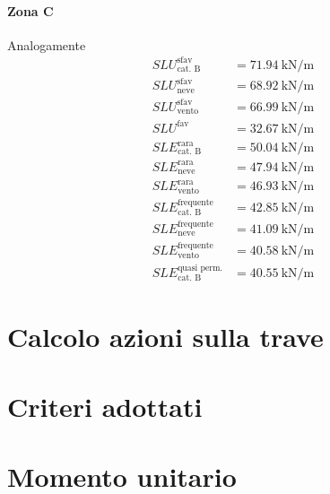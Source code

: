 \paragraph*{Zona C} Analogamente
\begin{align*} 
	SLU^{\text{sfav}}_{\text{cat. B}}		&= \SI{71.94}{\kilo\newton\per\meter} \\
	SLU^{\text{sfav}}_{\text{neve}} 		&= \SI{68.92}{\kilo\newton\per\meter} \\
	SLU^{\text{sfav}}_{\text{vento}} 		&= \SI{66.99}{\kilo\newton\per\meter} \\
	SLU^{\text{fav}} 						&= \SI{32.67}{\kilo\newton\per\meter} \\	
	SLE^{\text{rara}}_{\text{cat. B}} 		&= \SI{50.04}{\kilo\newton\per\meter} \\
	SLE^{\text{rara}}_{\text{neve}}			&= \SI{47.94}{\kilo\newton\per\meter} \\
	SLE^{\text{rara}}_{\text{vento}} 		&= \SI{46.93}{\kilo\newton\per\meter} \\
	SLE^{\text{frequente}}_{\text{cat. B}} 	&= \SI{42.85}{\kilo\newton\per\meter} \\
	SLE^{\text{frequente}}_{\text{neve}} 	&= \SI{41.09}{\kilo\newton\per\meter} \\
	SLE^{\text{frequente}}_{\text{vento}} 	&= \SI{40.58}{\kilo\newton\per\meter} \\
	SLE^{\text{quasi perm.}}_{\text{cat. B}}&= \SI{40.55}{\kilo\newton\per\meter}
\end{align*}

\section{Calcolo azioni sulla trave}
\section{Criteri adottati}
%

\section{Momento unitario}

